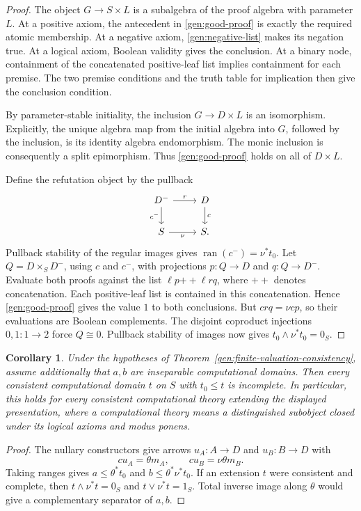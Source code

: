 \documentclass[11pt]{article}
\newtheorem{corollary}[theorem]{Corollary}
\theoremstyle{definition}
\theoremstyle{remark}
\newcommand{\ran}{\operatorname{ran}}
\begin{document}
\begin{proof}
The object $G\to S\times L$ is a subalgebra of the proof algebra
with parameter $L$. At a positive axiom, the antecedent in
\eqref{gen:good-proof} is exactly the required atomic membership.
At a negative axiom, \eqref{gen:negative-list} makes its negation true.
At a logical axiom, Boolean validity gives the conclusion. At a binary
node, containment of the concatenated positive-leaf list implies
containment for each premise. The two premise conditions and the truth
table for implication then give the conclusion condition.

By parameter-stable initiality, the inclusion $G\to D\times L$ is
an isomorphism. Explicitly, the unique algebra map from the initial
algebra into $G$, followed by the inclusion, is its identity algebra
endomorphism. The monic inclusion is consequently a split epimorphism.
Thus \eqref{gen:good-proof} holds on all of $D\times L$.

Define the refutation object by the pullback
\[
\begin{tikzcd}
 D^-\arrow[r,"r"]\arrow[d,"c^-"']&D\arrow[d,"c"]\\
 S\arrow[r,"\nu"']&S.
\end{tikzcd}
\]
Pullback stability of the regular images gives
$\ran(c^-)=\nu^*t_0$. Let $Q=D\times_S D^-$, using $c$ and $c^-$,
with projections $p:Q\to D$ and $q:Q\to D^-$. Evaluate both
proofs against the list $\ell p\mathbin{+\!+}\ell rq$, where
$+\!+$ denotes concatenation. Each positive-leaf list is contained in
this concatenation. Hence \eqref{gen:good-proof} gives the value $1$
to both conclusions. But $crq=\nu cp$, so their evaluations are Boolean
complements. The disjoint coproduct injections $0,1:1\to2$ force
$Q\cong0$. Pullback stability of images now gives
$t_0\wedge\nu^*t_0=0_S$.
\end{proof}

\begin{corollary}\label{gen:essential}
Under the hypotheses of
Theorem~\ref{gen:finite-valuation-consistency}, assume additionally
that $a,b$ are inseparable computational domains.
Then every consistent computational domain $t$ on $S$ with
$t_0\le t$ is incomplete. In particular, this holds for every
consistent computational theory extending the displayed presentation,
where a computational theory means a distinguished subobject closed
under its logical axioms and modus ponens.
\end{corollary}
\begin{proof}
The nullary constructors give arrows $u_A:A\to D$ and $u_B:B\to D$
with
\[
 cu_A=\theta m_A,\qquad cu_B=\nu\theta m_B.
\]
Taking ranges gives
$a\le\theta^*t_0$ and $b\le\theta^*\nu^*t_0$.
If an extension $t$ were consistent and complete, then
$t\wedge\nu^*t=0_S$ and $t\vee\nu^*t=1_S$. Total inverse image
along $\theta$ would give a complementary separator of $a,b$.
\end{proof}
\end{document}
